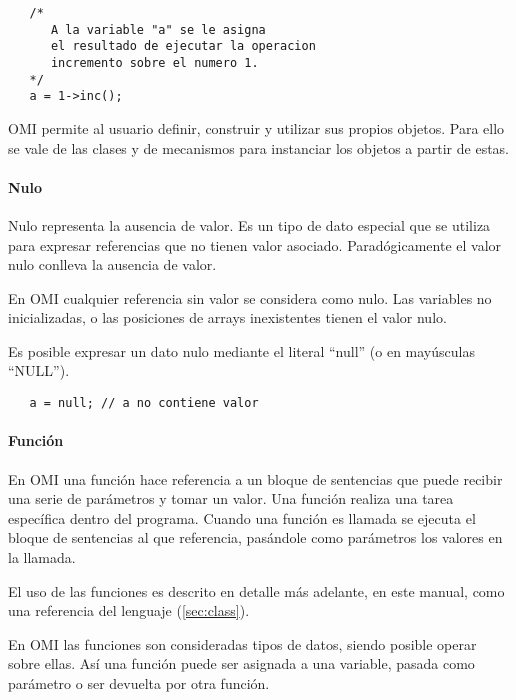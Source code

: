 \begin{lstlisting}
   /*
      A la variable "a" se le asigna
      el resultado de ejecutar la operacion 
      incremento sobre el numero 1. 
   */
   a = 1->inc();
\end{lstlisting} 

OMI permite al usuario definir, construir y utilizar sus propios objetos. Para ello se vale de las clases
y de mecanismos para instanciar los objetos a partir de estas.


\paragraph{Nulo}
Nulo representa la ausencia de valor. Es un tipo de dato especial que se utiliza para expresar referencias que no tienen valor asociado. Paradógicamente el
valor nulo conlleva la ausencia de valor. 

En OMI cualquier referencia sin valor se considera como nulo. Las variables no inicializadas, o las posiciones de arrays inexistentes tienen el valor nulo. 

Es posible expresar un dato nulo mediante el literal ``null'' (o en mayúsculas ``NULL''). \\

\begin{lstlisting}
   a = null; // a no contiene valor
\end{lstlisting} 

\paragraph{Función}\label{sec:type_func}
En OMI una función hace referencia a un bloque de sentencias que puede recibir una serie de parámetros y tomar un valor. Una función realiza una tarea específica dentro del programa.
Cuando una función es llamada se ejecuta el bloque de sentencias al que referencia, pasándole como parámetros los valores en la llamada. 

El uso de las funciones es descrito en detalle más adelante, en este manual, como una referencia del lenguaje (\autoref{sec:class}). 

En OMI las funciones son consideradas tipos de datos, siendo posible operar sobre ellas. Así una función puede ser asignada a una variable, pasada como parámetro 
o ser devuelta por otra función. \\

